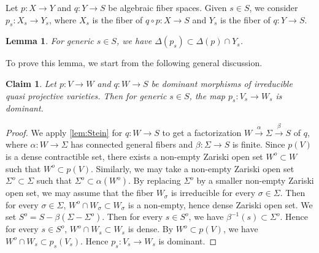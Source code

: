 \documentclass[11pt,english]{smfart}
\theoremstyle{plain}
\newtheorem{lem}[thm]{Lemma}
\newtheorem{claim}[thm]{Claim}
\theoremstyle{definition}
\theoremstyle{remark}
\numberwithin{equation}{subsection}
\theoremstyle{plain}
\begin{document}
Let $p:X\to Y$ and $q:Y\to S$ be algebraic fiber spaces.
Given $s\in S$, we consider $p_s:X_s\to Y_s$, where $X_s$ is the fiber of $q\circ p:X\to S$ and $Y_s$ is the fiber of $q:Y\to S$.


\begin{lem}\label{lem:20221020}
For generic $s\in S$, we have $\Delta(p_s)\subset \Delta (p)\cap Y_s$.
\end{lem}

To prove this lemma, we start from the following general discussion.



\begin{claim}\label{claim:202210221}
Let $p:V\to W$ and $q:W\to S$ be dominant morphisms of irreducible quasi projective varieties.
Then for generic $s\in S$, the map $p_s:V_s\to W_s$ is dominant.
\end{claim}

\begin{proof}
We apply \cref{lem:Stein} for $q:W\to S$ to get a factorization $W\overset{\alpha}{\to}\Sigma\overset{\beta}{\to}S$ of $q$, where $\alpha:W\to \Sigma$ has connected general fibers and $\beta:\Sigma\to S$ is finite. 
Since $p(V)$ is a dense contractible set, there exists a non-empty Zariski open set $W^o\subset W$ such that $W^o\subset p(V)$.
Similarly, we may take a non-empty Zariski open set $\Sigma^o\subset \Sigma$ such that $\Sigma^o\subset \alpha(W^o)$.
By replacing $\Sigma^o$ by a smaller non-empty Zariski open set, we may assume that the fiber $W_{\sigma}$ is irreducible for every $\sigma\in \Sigma$.
Then for every $\sigma\in \Sigma$, $W^o\cap W_{\sigma}\subset W_{\sigma}$ is a non-empty, hence dense Zariski open set.
We set $S^o=S-\beta(\Sigma-\Sigma^o)$.
Then for every $s\in S^o$, we have $\beta^{-1}(s)\subset \Sigma^o$.
Hence for every $s\in S^o$, $W^o\cap W_s\subset W_s$ is dense.
By $W^o\subset p(V)$, we have $W^o\cap W_s\subset p_s(V_s)$.
Hence $p_s:V_s\to W_s$ is dominant.
\end{proof}
\end{document}
